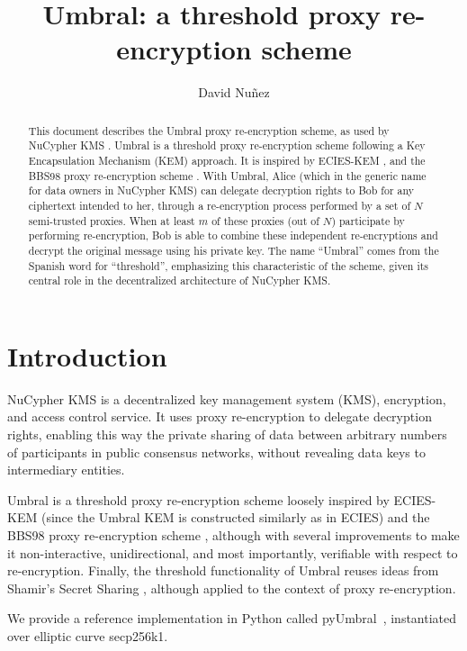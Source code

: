 \documentclass{amsart}
\title{Umbral: a threshold proxy re-encryption scheme}
\author{David Nuñez}
\date{} %
\newcommand{\pyumbral}{\textsf{pyUmbral}}
\newcommand{\secp}{\textsf{secp256k1}}
\begin{document}
\maketitle

\begin{abstract}
This document describes the Umbral proxy re-encryption scheme, as used by NuCypher KMS \cite{egorov2017nucypherkms}. 
Umbral is a threshold proxy re-encryption scheme following a Key Encapsulation Mechanism (KEM) approach. It is inspired by ECIES-KEM \cite{ansi-x9.63}, and the BBS98 proxy re-encryption scheme \cite{blaze1998divertible}. 
With Umbral, Alice (which in the generic name for data owners in NuCypher KMS) can delegate decryption rights to Bob for any ciphertext intended to her, through a re-encryption process performed by a set of $N$ semi-trusted proxies. When at least $m$ of these proxies (out of $N$) participate by performing re-encryption, Bob is able to combine these independent re-encryptions and decrypt the original message using his private key. 
The name ``Umbral'' comes from the Spanish word for ``threshold'', emphasizing this characteristic of the scheme, given its central role in the decentralized architecture of NuCypher KMS. 
\end{abstract}



\section{Introduction}

NuCypher KMS \cite{egorov2017nucypherkms} is a decentralized key management system (KMS), encryption, and access control service. 
It uses proxy re-encryption to delegate decryption rights, enabling this way the private sharing of data between arbitrary numbers of participants in public consensus networks, without revealing data keys to intermediary entities. 

Umbral is a threshold proxy re-encryption scheme loosely inspired by ECIES-KEM \cite{ansi-x9.63} (since the Umbral KEM is constructed similarly as in ECIES) and the BBS98 proxy re-encryption scheme \cite{blaze1998divertible}, although with several improvements to make it non-interactive, unidirectional, and most importantly, verifiable with respect to re-encryption. Finally, the threshold functionality of Umbral reuses ideas from Shamir's Secret Sharing \cite{shamir1979share}, although applied to the context of proxy re-encryption. 

We provide a reference implementation in Python called \pyumbral~\cite{pyumbral}, instantiated over elliptic curve \secp.
\end{document}
